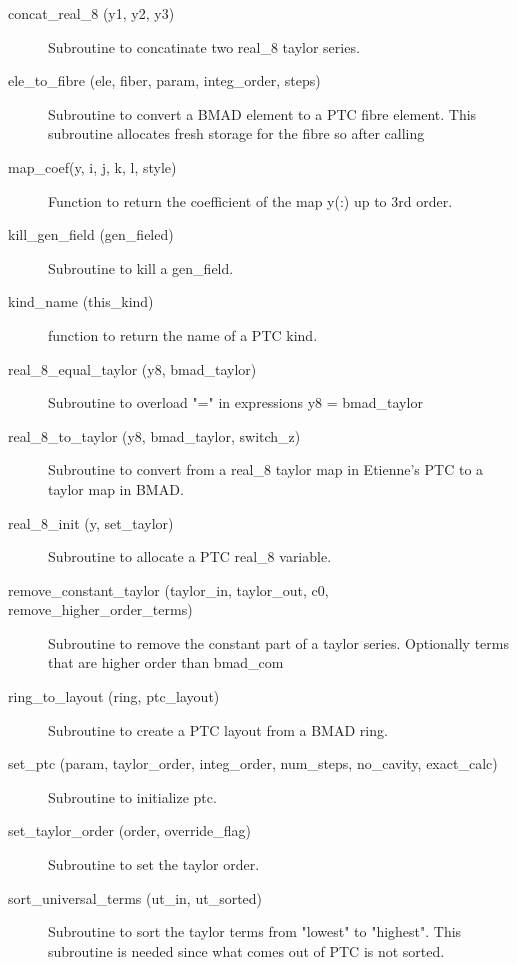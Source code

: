 \begin{description}

\item[concat\_real\_8 (y1, y2, y3)] \Newline
Subroutine to concatinate two real\_8 taylor series. 

\item[ele\_to\_fibre (ele, fiber, param, integ\_order, steps)] \Newline
Subroutine to convert a BMAD element to a PTC fibre element. 
This subroutine allocates fresh storage for the fibre so after calling 

\item[map\_coef(y, i, j, k, l, style)] \Newline
Function to return the coefficient of the map y(:) up to 3rd order. 

\item[kill\_gen\_field (gen\_fieled)] \Newline
Subroutine to kill a gen\_field. 

\item[kind\_name (this\_kind)] \Newline
function to return the name of a PTC kind. 

\item[real\_8\_equal\_taylor (y8, bmad\_taylor)] \Newline
Subroutine to overload "=" in expressions y8 = bmad\_taylor 

\item[real\_8\_to\_taylor (y8, bmad\_taylor, switch\_z)] \Newline
Subroutine to convert from a real\_8 taylor map in Etienne's PTC to a taylor map in BMAD. 

\item[real\_8\_init (y, set\_taylor)] \Newline
Subroutine to allocate a PTC real\_8 variable. 

\item[remove\_constant\_taylor (taylor\_in, taylor\_out, c0, remove\_higher\_order\_terms)] \Newline
Subroutine to remove the constant part of a taylor series. 
Optionally terms that are higher order than bmad\_com%

\item[ring\_to\_layout (ring, ptc\_layout)] \Newline
Subroutine to create a PTC layout from a BMAD ring. 

\item[set\_ptc (param, taylor\_order, integ\_order, num\_steps, no\_cavity, exact\_calc)] \Newline
Subroutine to initialize ptc. 

\item[set\_taylor\_order (order, override\_flag)] \Newline
Subroutine to set the taylor order. 

\item[sort\_universal\_terms (ut\_in, ut\_sorted)] \Newline
Subroutine to sort the taylor terms from "lowest" to "highest". 
This subroutine is needed since what comes out of PTC is not sorted. 


\end{description}
